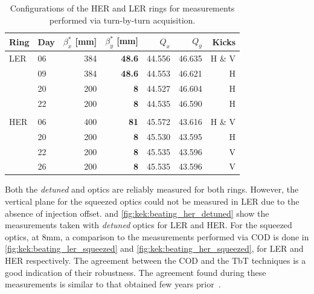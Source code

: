 \begin{table}
    \centering
    \begin{tabular}{llrrrrr}
    \hline
    Ring & Day & $\beta_x^*$ [mm] & $\beta_y^*$ [mm] & $Q_x$ & $Q_y$ & Kicks\\
    \hline
    LER        & 06 & 384 &\textbf{48.6} & 44.556 & 46.635 & H \& V \\
               & 09 & 384 &\textbf{48.6} & 44.553 & 46.621 & H  \\
               \hdashline
               & 20 & 200 & \textbf{8}   & 44.527 & 46.604 & H \\
               & 22 & 200 & \textbf{8}   & 44.535 & 46.590 & H \\
               &&&&&& \\
    HER        & 06 & 400 & \textbf{81}  & 45.572 & 43.616 & H \& V\\
               \hdashline
               & 20 & 200 & \textbf{8} & 45.530 & 43.595 & H \\
               & 22 & 200 & \textbf{8} & 45.535 & 43.596 & V \\
               & 26 & 200 & \textbf{8} & 45.535 & 43.596 & V \\
    \bottomrule
    \end{tabular}
  \caption{Configurations of the HER and LER rings for measurements performed via turn-by-turn
  acquisition.}
  \label{tab:superkekb:configurations}
\end{table}

Both the \textit{detuned} and  optics are reliably measured for
both rings. However, the vertical plane for the squeezed optics could not be measured
in LER due to the absence of injection offset.
 and \cref{fig:kek:beating_her_detuned} show the
measurements taken with \textit{detuned} optics for LER and HER. For the squeezed optics, at 8mm, a
comparison to the measurements performed via COD is done in \cref{fig:kek:beating_ler_squeezed} and
\cref{fig:kek:beating_her_squeezed}, for LER and HER respectively.
The agreement between the COD and the TbT techniques is a good indication of their robustness. The
agreement found during these measurements is similar to that obtained few years
prior~\cite{keintzel_jacqueline_beam_2022}.



